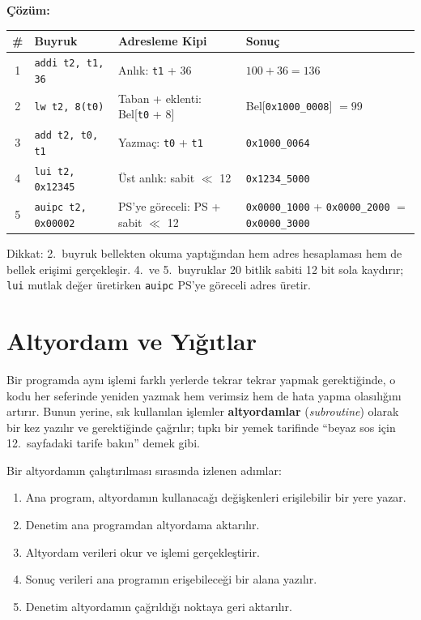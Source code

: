 \begin{ornek}[3.20]
\textbf{Çözüm:}

\begin{center}
\small
\begin{tabular}{clp{3.8cm}l}
\toprule
\textbf{\#} & \textbf{Buyruk} & \textbf{Adresleme Kipi} & \textbf{Sonuç} \\
\midrule
1 & \texttt{addi t2, t1, 36} & Anlık: \texttt{t1} + 36 & $100 + 36 = 136$ \\
2 & \texttt{lw t2, 8(t0)} & Taban + eklenti: Bel[\texttt{t0} + 8] & Bel[\texttt{0x1000\_0008}] $= 99$ \\
3 & \texttt{add t2, t0, t1} & Yazmaç: \texttt{t0} + \texttt{t1} & \texttt{0x1000\_0064} \\
4 & \texttt{lui t2, 0x12345} & Üst anlık: sabit $\ll$ 12 & \texttt{0x1234\_5000} \\
5 & \texttt{auipc t2, 0x00002} & PS'ye göreceli: PS + sabit $\ll$ 12 & \texttt{0x0000\_1000} + \texttt{0x0000\_2000} $=$ \texttt{0x0000\_3000} \\
\bottomrule
\end{tabular}
\end{center}

Dikkat: 2.~buyruk bellekten okuma yaptığından hem adres hesaplaması hem de bellek erişimi gerçekleşir. 4.~ve 5.~buyruklar 20 bitlik sabiti 12 bit sola kaydırır; \texttt{lui} mutlak değer üretirken \texttt{auipc} PS'ye göreceli adres üretir.
\end{ornek}

\section{Altyordam ve Yığıtlar}
\label{sec:altyordam-yigitlar}

Bir programda aynı işlemi farklı yerlerde tekrar tekrar yapmak gerektiğinde, o kodu her seferinde yeniden yazmak hem verimsiz hem de hata yapma olasılığını artırır. Bunun yerine, sık kullanılan işlemler \textbf{altyordamlar} (\emph{subroutine}) olarak bir kez yazılır ve gerektiğinde çağrılır; tıpkı bir yemek tarifinde ``beyaz sos için 12.~sayfadaki tarife bakın'' demek gibi.

Bir altyordamın çalıştırılması sırasında izlenen adımlar:
\begin{enumerate}
\item Ana program, altyordamın kullanacağı değişkenleri erişilebilir bir yere yazar.
\item Denetim ana programdan altyordama aktarılır.
\item Altyordam verileri okur ve işlemi gerçekleştirir.
\item Sonuç verileri ana programın erişebileceği bir alana yazılır.
\item Denetim altyordamın çağrıldığı noktaya geri aktarılır.
\end{enumerate}

